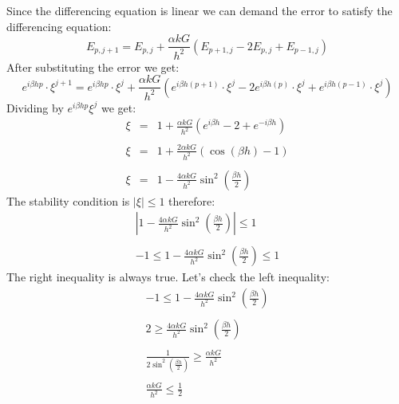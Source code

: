 \documentclass[11pt, a4paper]{article}
\begin{document}
\noindent Since the differencing equation is linear we can demand the error to satisfy the differencing equation:
\begin{equation}
    E_{p,j+1}=\displaystyle E_{p,j}+\frac{\alpha kG}{h^2}\left(E_{p+1,j}-2E_{p,j}+E_{p-1,j}\right)
\end{equation}
After substituting the error we get:
\begin{equation}
    e^{i\beta h p}\cdot\xi^{j+1}=\displaystyle e^{i\beta h p}\cdot\xi^j+\frac{\alpha kG}{h^2}\left(e^{i\beta h \left(p+1\right)}\cdot\xi^j-2e^{i\beta h \left(p\right)}\cdot\xi^j+e^{i\beta h \left(p-1\right)}\cdot\xi^j\right)
\end{equation}
Dividing by $e^{i\beta h p}\xi^j$ we get:
\begin{equation}
    \begin{array}{rcl}
        \xi & = & \displaystyle 1+\frac{\alpha kG}{h^2}\left(e^{i\beta h }-2+e^{-i\beta h }\right) \\\\
        \xi & = & \displaystyle 1+\frac{2\alpha kG}{h^2}\left(\cos\left(\beta h\right)-1\right) \\\\
        \xi & = & \displaystyle 1-\frac{4\alpha kG}{h^2}\sin^2\left(\frac{\beta h}{2}\right)
    \end{array}
\end{equation}
The stability condition is $\left|\xi\right|\le1$ therefore:
\begin{equation}
    \begin{array}{c}
        \left|\displaystyle 1-\frac{4\alpha kG}{h^2}\sin^2\left(\frac{\beta h}{2}\right)\right|\le1 \\\\
        -1\le\displaystyle 1-\frac{4\alpha kG}{h^2}\sin^2\left(\frac{\beta h}{2}\right)\le1
    \end{array}
\end{equation}
The right inequality is always true. Let's check the left inequality:
\begin{equation}
    \begin{array}{c}
        -1\le\displaystyle 1-\frac{4\alpha kG}{h^2}\sin^2\left(\frac{\beta h}{2}\right) \\\\
        2\ge\displaystyle \frac{4\alpha kG}{h^2}\sin^2\left(\frac{\beta h}{2}\right) \\\\
        \displaystyle \frac{1}{2\sin^2\left(\frac{\beta h}{2}\right)}\ge\displaystyle \frac{\alpha kG}{h^2} \\\\
        \displaystyle\frac{\alpha kG}{h^2}\le\frac{1}{2}
    \end{array}
\end{equation}
\end{document}
